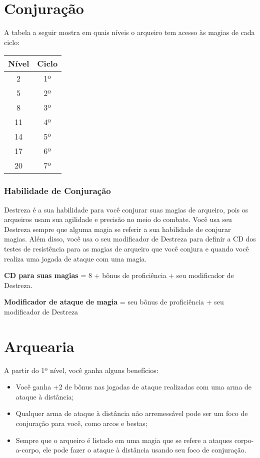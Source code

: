 \begin{multicols}{2}
\section*{Conjuração}%

A tabela a seguir mostra em quais níveis o arqueiro tem acesso às magias de cada
ciclo:

\begin{center}
\begin{tabular}{|||c||c|||}
    \hline
    \textbf{Nível} & \textbf{Ciclo} \\
    \hline
    2 & 1º \\
    \hline
    5 & 2º \\
    \hline
    8 & 3º \\
    \hline
    11 & 4º \\
    \hline
    14 & 5º \\
    \hline
    17 & 6º \\
    \hline
    20 & 7º \\
    \hline
\end{tabular}
\end{center}

\subsubsection*{Habilidade de Conjuração}%

Destreza é a sua habilidade para você conjurar suas magias de arqueiro, pois os
arqueiros usam sua agilidade e precisão no meio do combate.  Você usa seu
Destreza sempre que alguma magia se referir a sua habilidade de conjurar magias.
Além disso, você usa o seu modificador de Destreza para definir a CD dos testes
de resistência para as magias de arqueiro que você conjura e quando você realiza
uma jogada de ataque com uma magia.

\begin{center}
\textbf{CD para suas magias} = 8 + bônus de proficiência + seu modificador de
Destreza. \nl

\textbf{Modificador de ataque de magia} = seu bônus de proficiência + seu
modificador de Destreza
\end{center}

\section*{Arquearia}%

A partir do 1º nível, você ganha alguns benefícios:
\begin{itemize}
    \item Você ganha +2 de bônus nas jogadas de ataque realizadas com uma arma
        de ataque à distância;
    \item Qualquer arma de ataque à distância não arremessável pode ser um foco
        de conjuração para você, como arcos e bestas;
    \item Sempre que o arqueiro é listado em uma magia que se refere a ataques
        corpo-a-corpo, ele pode fazer o ataque à distância usando seu foco de
        conjuração.
\end{itemize}


\end{multicols}
